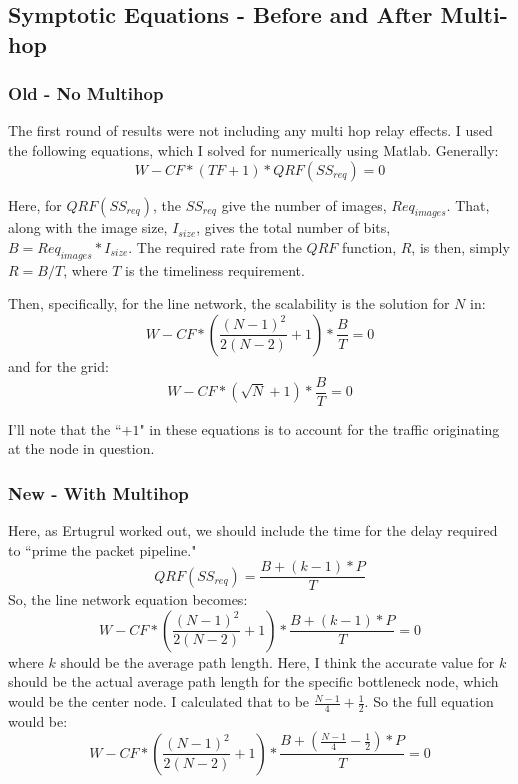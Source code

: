 \documentclass[conference]{IEEEtran}
\begin{document}
\subsection{Symptotic Equations - Before and After Multi-hop}
\subsubsection{Old - No Multihop}
The first round of results were not including any multi hop relay effects.   I used the following equations, which I solved for numerically using Matlab.  Generally:
\begin{equation}
	W - CF*(TF+1)*QRF(SS_{req}) = 0
\end{equation}

Here, for $QRF(SS_{req})$, the $SS_{req}$ give the number of images, $Req_{images}$.  That, along with the image size, $I_{size}$, gives the total number of bits, $B = Req_{images}*I_{size}$.  The required rate from the $QRF$ function, $R$, is then, simply $R = B/T$, where $T$ is the timeliness requirement.

Then, specifically, for the line network, the scalability is the solution for $N$ in:
\begin{equation}
	W - CF*(\frac{(N-1)^2}{2(N-2)}+1)*\frac{B}{T} = 0
\end{equation}
and for the grid:
\begin{equation}
	W - CF*(\sqrt{N}+1)*\frac{B}{T} = 0
\end{equation}

I'll note that the ``$+1$" in these equations is to account for the traffic originating at the node in question.

\subsubsection{New - With Multihop}
Here, as Ertugrul worked out, we should include the time for the delay  required to ``prime the packet pipeline."  
\begin{equation}
	QRF(SS_{req}) = \frac{B + (k-1)*P}{T}
\end{equation}
So, the line network equation becomes:
\begin{equation}
	W - CF*(\frac{(N-1)^2}{2(N-2)}+1)*\frac{B + (k-1)*P}{T} = 0
\end{equation}
where $k$ should be the average path length.  Here, I think the accurate value for $k$ should be the actual average path length for the specific bottleneck node, which would be the center node.  I calculated that to be $\frac{N-1}{4} + \frac{1}{2}$.  So the full equation would be:
\begin{equation}
	W - CF*(\frac{(N-1)^2}{2(N-2)}+1)*\frac{B + (\frac{N-1}{4} - \frac{1}{2})*P}{T} = 0
\end{equation}
\end{document}
